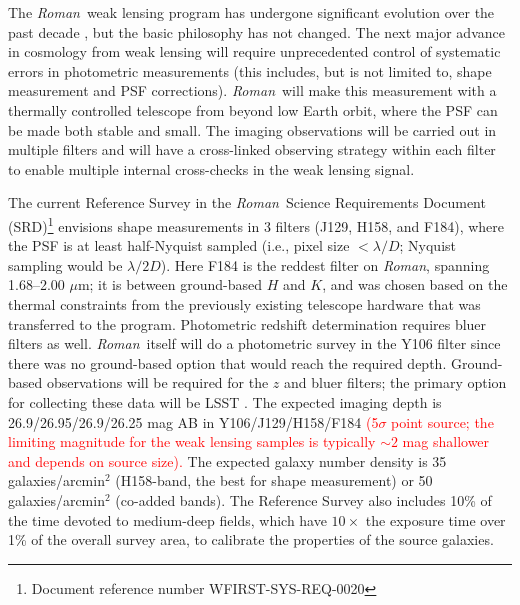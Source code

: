 \documentclass[usenatbib]{mnras}
\newcommand{\wfirst}{{\slshape Roman}}
\newcommand{\changetext}[1]{\textcolor{red}{#1}}
\begin{document}
The \wfirst\ weak lensing program has undergone significant evolution over the past decade \citep{2011arXiv1108.1374G, 2012arXiv1208.4012G, 2013arXiv1305.5422S, 2015arXiv150303757S, 2018arXiv180403628D, 2019arXiv190205569A}, but the basic philosophy has not changed. The next major advance in cosmology from weak lensing will require unprecedented control of systematic errors in photometric measurements (this includes, but is not limited to, shape measurement and PSF corrections). \wfirst\ will make this measurement with a thermally controlled telescope from beyond low Earth orbit, where the PSF can be made both stable and small. The imaging observations will be carried out in multiple filters and will have a cross-linked observing strategy within each filter to enable multiple internal cross-checks in the weak lensing signal.

The current Reference Survey in the \wfirst\ Science Requirements Document (SRD)\footnote{Document reference number WFIRST-SYS-REQ-0020} envisions shape measurements in 3 filters (J129, H158, and F184), where the PSF is at least half-Nyquist sampled (i.e., pixel size $<\lambda/D$; Nyquist sampling would be $\lambda/2D$). Here F184 is the reddest filter on \wfirst, spanning 1.68--2.00 $\mu$m; it is between ground-based $H$ and $K$, and was chosen based on the thermal constraints from the previously existing telescope hardware that was transferred to the program. Photometric redshift determination requires bluer filters as well. \wfirst\ itself will do a photometric survey in the Y106 filter since there was no ground-based option that would reach the required depth. Ground-based observations will be required for the $z$ and bluer filters; the primary option for collecting these data will be LSST \citep{2009arXiv0912.0201L,2019ApJ...873..111I}.  The expected imaging depth is 26.9/26.95/26.9/26.25 mag AB in Y106/J129/H158/F184 \changetext{(5$\sigma$ point source; the limiting magnitude for the weak lensing samples is typically $\sim 2$ mag shallower and depends on source size).} The expected galaxy number density is 35 galaxies/arcmin$^2$ (H158-band, the best for shape measurement) or 50 galaxies/arcmin$^2$ (co-added bands). The Reference Survey also includes 10\% of the time devoted to medium-deep fields, which have $10\times$ the exposure time over 1\% of the overall survey area, to calibrate the properties of the source galaxies. 
\end{document}
